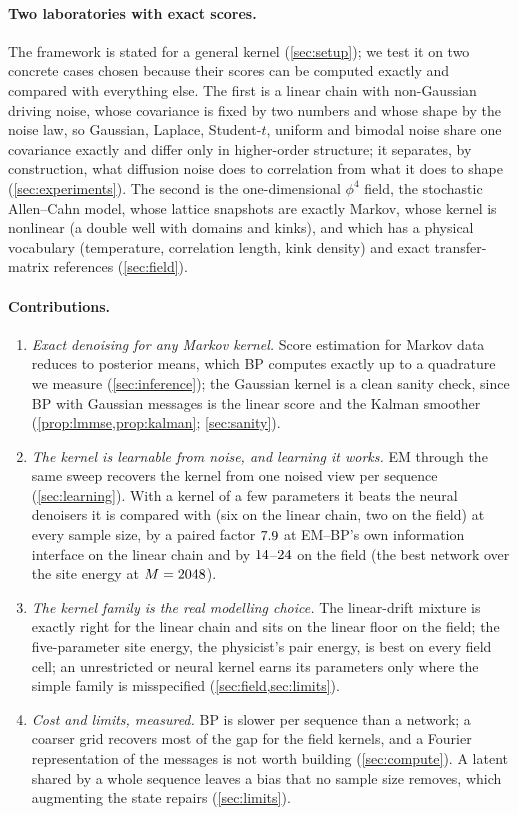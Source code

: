 \paragraph{Two laboratories with exact scores.}
The framework is stated for a general kernel (\cref{sec:setup}); we test it on two concrete
cases chosen because their scores can be computed exactly and compared with everything else.
The first is a linear chain with non-Gaussian driving noise, whose covariance is fixed by two
numbers and whose shape by the noise law, so Gaussian, Laplace, Student-$t$, uniform and
bimodal noise share one covariance exactly and differ only in higher-order structure; it
separates, by construction, what diffusion noise does to correlation from what it does to
shape (\cref{sec:experiments}). The second is the one-dimensional $\phi^4$ field, the
stochastic Allen--Cahn model, whose lattice snapshots are exactly Markov, whose kernel is
nonlinear (a double well with domains and kinks), and which has a physical vocabulary
(temperature, correlation length, kink density) and exact transfer-matrix references
(\cref{sec:field}).

\paragraph{Contributions.}
\begin{enumerate}[label=(\roman*),leftmargin=1.6em,itemsep=0.1em,topsep=0.2em]
\item \emph{Exact denoising for any Markov kernel.} Score estimation for Markov data reduces
to posterior means, which BP computes exactly up to a quadrature we measure
(\cref{sec:inference}); the Gaussian kernel is a clean sanity check, since BP with Gaussian
messages is the linear score and the Kalman smoother (\cref{prop:lmmse,prop:kalman};
\cref{sec:sanity}).
\item \emph{The kernel is learnable from noise, and learning it works.} EM through the same
sweep recovers the kernel from one noised view per sequence (\cref{sec:learning}). With a kernel of
a few parameters it beats the neural denoisers it is compared with (six on the linear chain, two on the field) at every sample
size, by a paired factor $7.9$ at EM--BP's own information interface on the linear chain and by
$14$--$24$ on the field (the best network over the site energy at $M=2048$).
\item \emph{The kernel family is the real modelling choice.} The linear-drift mixture is
exactly right for the linear chain and sits on the linear floor on the field; the
five-parameter site energy, the physicist's pair energy, is best on every field cell; an
unrestricted or neural kernel earns its parameters only where the simple family is
misspecified (\cref{sec:field,sec:limits}).
\item \emph{Cost and limits, measured.} BP is slower per sequence than a network; a coarser grid
recovers most of the gap for the field kernels, and a Fourier representation of the messages
is not worth building (\cref{sec:compute}). A latent shared by a whole sequence leaves a bias
that no sample size removes, which augmenting the state repairs (\cref{sec:limits}).
\end{enumerate}

